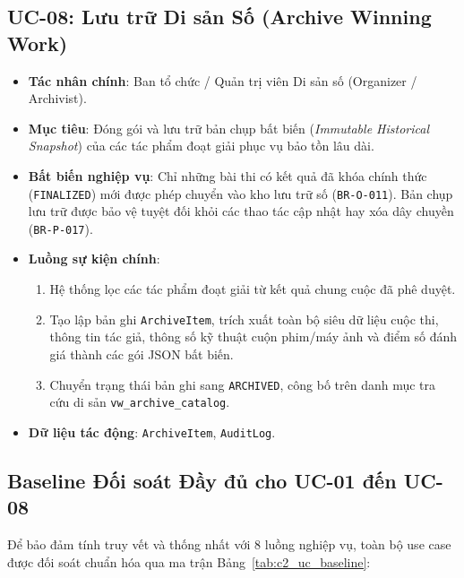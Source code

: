 \subsection{UC-08: Lưu trữ Di sản Số (Archive Winning Work)}
\begin{itemize}
    \item \textbf{Tác nhân chính}: Ban tổ chức / Quản trị viên Di sản số (Organizer / Archivist).
    \item \textbf{Mục tiêu}: Đóng gói và lưu trữ bản chụp bất biến (\textit{Immutable Historical Snapshot}) của các tác phẩm đoạt giải phục vụ bảo tồn lâu dài.
    \item \textbf{Bất biến nghiệp vụ}: Chỉ những bài thi có kết quả đã khóa chính thức (\texttt{FINALIZED}) mới được phép chuyển vào kho lưu trữ số (\texttt{BR-O-011}). Bản chụp lưu trữ được bảo vệ tuyệt đối khỏi các thao tác cập nhật hay xóa dây chuyền (\texttt{BR-P-017}).
    \item \textbf{Luồng sự kiện chính}:
    \begin{enumerate}
        \item Hệ thống lọc các tác phẩm đoạt giải từ kết quả chung cuộc đã phê duyệt.
        \item Tạo lập bản ghi \texttt{ArchiveItem}, trích xuất toàn bộ siêu dữ liệu cuộc thi, thông tin tác giả, thông số kỹ thuật cuộn phim/máy ảnh và điểm số đánh giá thành các gói JSON bất biến.
        \item Chuyển trạng thái bản ghi sang \texttt{ARCHIVED}, công bố trên danh mục tra cứu di sản \texttt{vw\_archive\_catalog}.
    \end{enumerate}
    \item \textbf{Dữ liệu tác động}: \texttt{ArchiveItem}, \texttt{AuditLog}.
\end{itemize}

\subsection{Baseline Đối soát Đầy đủ cho UC-01 đến UC-08}
Để bảo đảm tính truy vết và thống nhất với 8 luồng nghiệp vụ, toàn bộ use case được đối soát chuẩn hóa qua ma trận Bảng~\ref{tab:c2_uc_baseline}:

